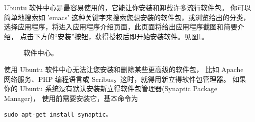 Ubuntu 软件中心是最容易使用的，它能让你安装和卸载许多流行软件包。
你可以简单地搜索如 'emacs' 这种关键字来搜索您想安装的软件包，或浏览给出的分类，
选择应用程序，将进入应用程序介绍页面，此页面将给出应用程序截图和简要介绍，
点击下方的“安装”按钮，获得授权后即开始安装软件。见图\ref{fig:Software}。
\begin{figure}[htbp]
	\centering
	\hfill
        \caption{软件中心。}
	\label{fig:Software}
\end{figure}

使用 Ubuntu 软件中心无法让您安装和删除某些更高级的软件包，
比如 Apache 网络服务、PHP 编程语言或 Scribus。这时，就得用新立得软件包管理器。
如果你的 Ubuntu 系统没有默认安装新立得软件包管理器(Synaptic Package Manager)，
使用前需要安装它，基本命令为
\begin{verbatim}
sudo apt-get install synaptic。
\end{verbatim}

